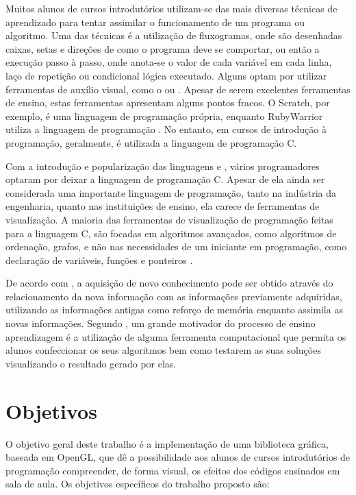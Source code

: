 \documentclass[12pt, %
openright,
oneside, %
a4paper,    %
brazil]{facom-ufu-abntex2}
\begin{document}
Muitos alunos de cursos introdutórios utilizam-se das mais diversas técnicas de aprendizado para tentar assimilar o funcionamento de um programa ou algoritmo. Uma das técnicas é a utilização de fluxogramas, onde são desenhadas caixas, setas e direções de como o programa deve se comportar, ou então a execução passo à passo, onde anota-se o valor de cada variável em cada linha, laço de repetição ou condicional lógica executado. Alguns optam por utilizar ferramentas de auxílio visual, como o  ou . Apesar de serem excelentes ferramentas de ensino, estas ferramentas apresentam alguns pontos fracos. O Scratch, por exemplo, é uma linguagem de programação própria, enquanto RubyWarrior utiliza a linguagem de programação . No entanto, em cursos de introdução à programação, geralmente, é utilizada a linguagem de programação C.

Com a introdução e popularização das linguagens  e , vários programadores optaram por deixar a linguagem de programação C. Apesar de ela ainda ser considerada uma importante linguagem de programação, tanto na indústria da engenharia, quanto nas instituições de ensino, ela carece de ferramentas de visualização. A maioria das ferramentas de visualização de programação feitas para a linguagem C, são focadas em algoritmos avançados, como algoritmos de ordenação, grafos, e não nas necessidades de um iniciante em programação, como declaração de variáveis, funções e ponteiros \cite{kirby2010program}.

De acordo com , a aquisição de novo conhecimento pode ser obtido através do relacionamento da nova informação com as informações previamente adquiridas, utilizando as informações antigas como reforço de memória enquanto assimila as novas informações. Segundo , um grande motivador do processo de ensino aprendizagem é a utilização de alguma ferramenta computacional que permita os alunos confeccionar os seus algoritmos bem como testarem as suas soluções visualizando o resultado gerado por elas.

\section{Objetivos}
O objetivo geral deste trabalho é a implementação de uma biblioteca gráfica, baseada em OpenGL, que dê a possibilidade aos alunos de cursos introdutórios de programação compreender, de forma visual, os efeitos dos códigos ensinados em sala de aula. Os objetivos específicos do trabalho proposto são:
\end{document}
